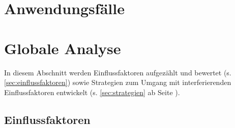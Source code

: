 \documentclass[enabledeprecatedfontcommands,fontsize=12pt,paper=a4,twoside,parskip=half]{scrartcl}
\newcounter{issue}
\newcounter{strategie}%
\begin{document}
\clearpage

\section{Anwendungsfälle}
\label{sec:anwendungsfaelle}

\clearpage

\section{Globale Analyse}
\label{sec:globale_analyse}

In diesem Abschnitt werden Einflussfaktoren aufgezählt und bewertet (s. \autoref{sec:einflussfaktoren}) sowie Strategien zum Umgang mit interferierenden Einflussfaktoren entwickelt (s. \autoref{sec:strategien} ab Seite \pageref{sec:strategien}).

\subsection{Einflussfaktoren}
\label{sec:einflussfaktoren}

\end{document}
